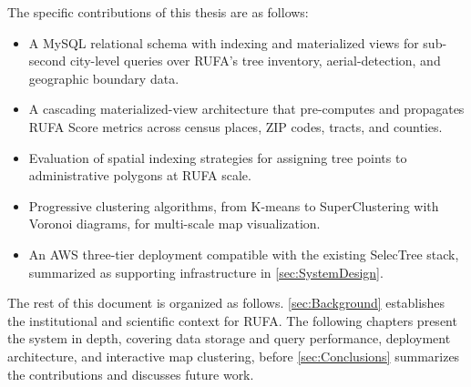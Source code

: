 The specific contributions of this thesis are as follows:
\begin{itemize}
    \item A MySQL relational schema with indexing and materialized views for sub-second city-level queries over RUFA's tree inventory, aerial-detection, and geographic boundary data.
    \item A cascading materialized-view architecture that pre-computes and propagates RUFA Score metrics across census places, ZIP codes, tracts, and counties.
    \item Evaluation of spatial indexing strategies for assigning tree points to administrative polygons at RUFA scale.
    \item Progressive clustering algorithms, from K-means to SuperClustering with Voronoi diagrams, for multi-scale map visualization.
    \item An AWS three-tier deployment compatible with the existing SelecTree stack, summarized as supporting infrastructure in \autoref{sec:SystemDesign}.
\end{itemize}

The rest of this document is organized as follows. \autoref{sec:Background} establishes the institutional and scientific context for RUFA. The following chapters present the system in depth, covering data storage and query performance, deployment architecture, and interactive map clustering, before \autoref{sec:Conclusions} summarizes the contributions and discusses future work.
